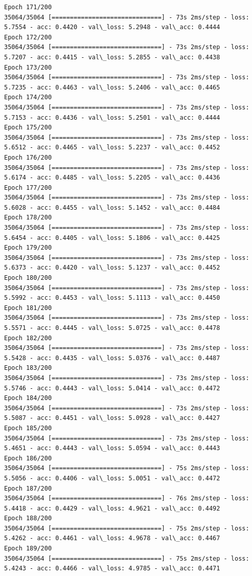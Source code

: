 \documentclass[11pt]{article}
\begin{document}
\begin{Verbatim}[commandchars=\\\{\}]
Epoch 171/200
35064/35064 [==============================] - 73s 2ms/step - loss: 5.7554 - acc: 0.4420 - val\_loss: 5.2948 - val\_acc: 0.4444
Epoch 172/200
35064/35064 [==============================] - 73s 2ms/step - loss: 5.7207 - acc: 0.4415 - val\_loss: 5.2855 - val\_acc: 0.4438
Epoch 173/200
35064/35064 [==============================] - 73s 2ms/step - loss: 5.7235 - acc: 0.4463 - val\_loss: 5.2406 - val\_acc: 0.4465
Epoch 174/200
35064/35064 [==============================] - 73s 2ms/step - loss: 5.7153 - acc: 0.4436 - val\_loss: 5.2501 - val\_acc: 0.4444
Epoch 175/200
35064/35064 [==============================] - 73s 2ms/step - loss: 5.6512 - acc: 0.4465 - val\_loss: 5.2237 - val\_acc: 0.4452
Epoch 176/200
35064/35064 [==============================] - 73s 2ms/step - loss: 5.6174 - acc: 0.4485 - val\_loss: 5.2205 - val\_acc: 0.4436
Epoch 177/200
35064/35064 [==============================] - 73s 2ms/step - loss: 5.6028 - acc: 0.4455 - val\_loss: 5.1452 - val\_acc: 0.4484
Epoch 178/200
35064/35064 [==============================] - 73s 2ms/step - loss: 5.6454 - acc: 0.4405 - val\_loss: 5.1806 - val\_acc: 0.4425
Epoch 179/200
35064/35064 [==============================] - 73s 2ms/step - loss: 5.6373 - acc: 0.4420 - val\_loss: 5.1237 - val\_acc: 0.4452
Epoch 180/200
35064/35064 [==============================] - 73s 2ms/step - loss: 5.5992 - acc: 0.4453 - val\_loss: 5.1113 - val\_acc: 0.4450
Epoch 181/200
35064/35064 [==============================] - 73s 2ms/step - loss: 5.5571 - acc: 0.4445 - val\_loss: 5.0725 - val\_acc: 0.4478
Epoch 182/200
35064/35064 [==============================] - 73s 2ms/step - loss: 5.5428 - acc: 0.4435 - val\_loss: 5.0376 - val\_acc: 0.4487
Epoch 183/200
35064/35064 [==============================] - 73s 2ms/step - loss: 5.5746 - acc: 0.4443 - val\_loss: 5.0414 - val\_acc: 0.4472
Epoch 184/200
35064/35064 [==============================] - 73s 2ms/step - loss: 5.5087 - acc: 0.4451 - val\_loss: 5.0928 - val\_acc: 0.4427
Epoch 185/200
35064/35064 [==============================] - 73s 2ms/step - loss: 5.4651 - acc: 0.4443 - val\_loss: 5.0594 - val\_acc: 0.4443
Epoch 186/200
35064/35064 [==============================] - 75s 2ms/step - loss: 5.5056 - acc: 0.4406 - val\_loss: 5.0051 - val\_acc: 0.4472
Epoch 187/200
35064/35064 [==============================] - 76s 2ms/step - loss: 5.4418 - acc: 0.4429 - val\_loss: 4.9621 - val\_acc: 0.4492
Epoch 188/200
35064/35064 [==============================] - 75s 2ms/step - loss: 5.4262 - acc: 0.4461 - val\_loss: 4.9678 - val\_acc: 0.4467
Epoch 189/200
35064/35064 [==============================] - 75s 2ms/step - loss: 5.4243 - acc: 0.4466 - val\_loss: 4.9785 - val\_acc: 0.4471

\end{Verbatim}
\end{document}
